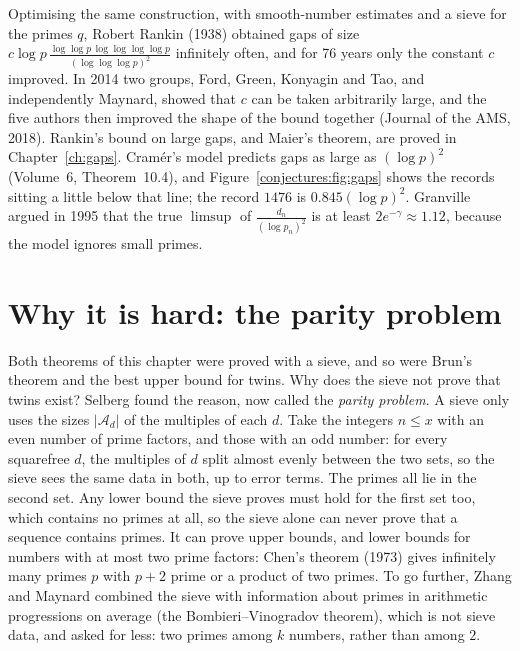 \begin{remark}
Optimising the same construction, with smooth-number estimates and a sieve for the primes $q$, Robert Rankin (1938) obtained gaps of size
$c\log p\,\frac{\log\log p\,\log\log\log\log p}{(\log\log\log p)^2}$ infinitely often, and for 76 years only the constant $c$ improved. In 2014 two groups,
Ford, Green, Konyagin and Tao, and independently Maynard, showed that $c$ can be taken arbitrarily large, and the five authors then improved the
shape of the bound together (Journal of the AMS, 2018). Rankin's bound on large gaps, and Maier's theorem, are proved in Chapter~\ref{ch:gaps}. Cram\'er's model predicts gaps as large as $(\log p)^2$ (Volume~6, Theorem~10.4), and
Figure~\ref{conjectures:fig:gaps} shows the records sitting a little below that line; the record $1476$ is $0.845(\log p)^2$. Granville argued in 1995 that the
true $\limsup$ of $\frac{d_n}{(\log p_n)^2}$ is at least $2e^{-\gamma}\approx1.12$, because the model ignores small primes.
\end{remark}

\section{Why it is hard: the parity problem}

Both theorems of this chapter were proved with a sieve, and so were Brun's theorem and the best upper bound for twins. Why does the sieve not prove
that twins exist? Selberg found the reason, now called the \emph{parity problem}. A sieve only uses the sizes $|\mathcal A_d|$ of the multiples of each
$d$. Take the integers $n\le x$ with an even number of prime factors, and those with an odd number: for every squarefree $d$, the multiples of $d$ split
almost evenly between the two sets, so the sieve sees the same data in both, up to error terms. The primes all lie in the second set. Any lower bound
the sieve proves must hold for the first set too, which contains no primes at all, so the sieve alone can never prove that a sequence contains primes.
It can prove upper bounds, and lower bounds for numbers with at most two prime factors: Chen's theorem (1973) gives infinitely many primes $p$ with
$p+2$ prime or a product of two primes. To go further, Zhang and Maynard combined the sieve with information about primes in arithmetic progressions
on average (the Bombieri--\allowbreak Vinogradov theorem), which is not sieve data, and asked for less: two primes among $k$ numbers, rather than among $2$.

